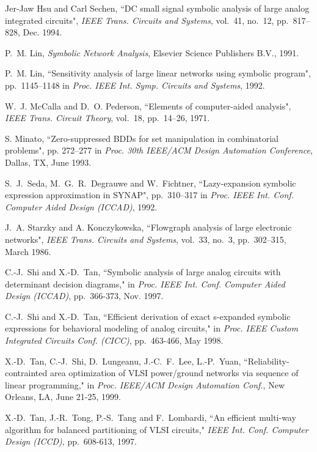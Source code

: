 \begin{thebibliography}{99}
Jer-Jaw Hsu and Carl Sechen, 
``DC small signal symbolic analysis of
large analog integrated circuits",
{\it IEEE Trans. Circuits and Systems}, vol.~41, no.~12,
pp.~817--828, Dec. 1994.

P.~M. Lin, 
{\em Symbolic Network Analysis}, Elsevier Science Publishers B.V., 
1991.

P.~M. Lin, ``Sensitivity analysis of large linear networks 
using symbolic program",
pp.~1145--1148 in {\it Proc. IEEE Int. Symp. Circuits and Systems}, 1992.

W.~J. McCalla and D.~O. Pederson,
``Elements of computer-aided analysis",
{\it IEEE Trans. Circuit Theory},
vol.~18, pp.~14--26, 1971.

S. Minato, 
``Zero-suppressed BDDs for set manipulation in combinatorial 
problems", pp. 272--277 in 
{\it Proc. 30th IEEE/ACM Design Automation Conference}, Dallas, TX, June 1993.

S.~J.~Seda, M.~G.~R.~Degrauwe and W.~Fichtner,
``Lazy-expansion symbolic expression approximation in SYNAP",
pp.~310--317 in 
{\it Proc. IEEE Int. Conf. Computer Aided Design (ICCAD)}, 1992.

J.~A. Starzky and A. Konczykowska,
``Flowgraph analysis of large electronic networks",
{\it IEEE Trans. Circuits and Systems},
vol.~33, no.~3, pp.~302--315, March 1986.

C.-J.~Shi and X.-D.~Tan,
``Symbolic analysis of large analog circuits with
determinant decision diagrams,"
in {\it Proc. IEEE Int. Conf. Computer Aided Design (ICCAD)},
pp.~366-373, Nov. 1997.


C.-J.~Shi and X.-D.~Tan,
``Efficient derivation of exact s-expanded symbolic expressions
for behavioral modeling of analog circuits,"
in {\it Proc. IEEE Custom Integrated Circuits Conf. (CICC)},
pp.~463-466, May 1998.

X.-D.~Tan, C.-J.~Shi, D.~Lungeanu, J.-C.~F.~Lee, L.-P.~Yuan,
``Reliability-contrainted area 
optimization of VLSI power/ground networks via
sequence of linear programming,"
in {\it Proc. IEEE/ACM Design Automation Conf.}, 
New Orleans, LA, June 21-25, 1999.

X.-D.~Tan, J.-R.~Tong, P.-S.~Tang and F.~Lombardi,
``An efficient multi-way algorithm for balanced partitioning
of VLSI circuits,"
{\it IEEE Int. Conf. Computer Design (ICCD)}, pp.~608-613, 1997.


\end{thebibliography}
